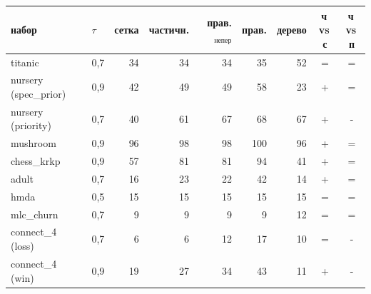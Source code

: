 \begin{tabular}{llrrrrrcc}
\toprule
набор & $\tau$ & сетка & частичн. & прав.$_{\mathrm{непер}}$ & прав. & дерево & ч$\,$vs$\,$с & ч$\,$vs$\,$п\\
\midrule
titanic & 0{,}7 & 34 & 34 & 34 & 35 & 52 & = & =\\
nursery (spec\_prior) & 0{,}9 & 42 & 49 & 49 & 58 & 23 & + & =\\
nursery (priority) & 0{,}7 & 40 & 61 & 67 & 68 & 67 & + & -\\
mushroom & 0{,}9 & 96 & 98 & 98 & 100 & 96 & + & =\\
chess\_krkp & 0{,}9 & 57 & 81 & 81 & 94 & 41 & + & =\\
adult & 0{,}7 & 16 & 23 & 22 & 42 & 14 & + & =\\
hmda & 0{,}5 & 15 & 15 & 15 & 15 & 15 & = & =\\
mlc\_churn & 0{,}7 & 9 & 9 & 9 & 9 & 12 & = & =\\
connect\_4 (loss) & 0{,}7 & 6 & 6 & 12 & 17 & 10 & = & -\\
connect\_4 (win) & 0{,}9 & 19 & 27 & 34 & 43 & 11 & + & -\\
\bottomrule
\end{tabular}
